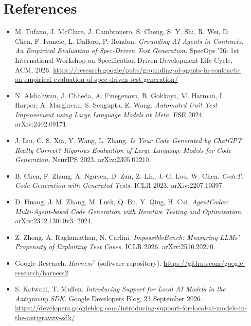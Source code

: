 \documentclass[11pt]{article}
\begin{document}
\section*{References}
\begin{itemize}
\item [R1] M. Tufano, J. McClure, J. Cambronero, S. Cheng, S. Y. Shi, R. Wei, D. Chen, F. Ivancic, L. Dalloro, P. Rondon. \emph{Grounding AI Agents in Contracts: An Empirical Evaluation of Spec-Driven Test Generation.} SpecOps '26: 1st International Workshop on Specification-Driven Development Life Cycle, ACM, 2026. \url{https://research.google/pubs/grounding-ai-agents-in-contracts-an-empirical-evaluation-of-spec-driven-test-generation/}
\item [R2] N. Alshahwan, J. Chheda, A. Finegenova, B. Gokkaya, M. Harman, I. Harper, A. Marginean, S. Sengupta, E. Wang. \emph{Automated Unit Test Improvement using Large Language Models at Meta.} FSE 2024. arXiv:2402.09171.
\item [R3] J. Liu, C. S. Xia, Y. Wang, L. Zhang. \emph{Is Your Code Generated by ChatGPT Really Correct? Rigorous Evaluation of Large Language Models for Code Generation.} NeurIPS 2023. arXiv:2305.01210.
\item [R4] B. Chen, F. Zhang, A. Nguyen, D. Zan, Z. Lin, J.-G. Lou, W. Chen. \emph{CodeT: Code Generation with Generated Tests.} ICLR 2023. arXiv:2207.10397.
\item [R5] D. Huang, J. M. Zhang, M. Luck, Q. Bu, Y. Qing, H. Cui. \emph{AgentCoder: Multi-Agent-based Code Generation with Iterative Testing and Optimisation.} arXiv:2312.13010v3, 2024.
\item [R6] Z. Zhong, A. Raghunathan, N. Carlini. \emph{ImpossibleBench: Measuring LLMs' Propensity of Exploiting Test Cases.} ICLR 2026. arXiv:2510.20270.
\item [R7] Google Research. \emph{Harness$^{2}$} (software repository). \url{https://github.com/google-research/harness2}
\item [R8] S. Kotwani, T. Mullen. \emph{Introducing Support for Local AI Models in the Antigravity SDK.} Google Developers Blog, 23 September 2026. \url{https://developers.googleblog.com/introducing-support-for-local-ai-models-in-the-antigravity-sdk/}
\end{itemize}
\end{document}
